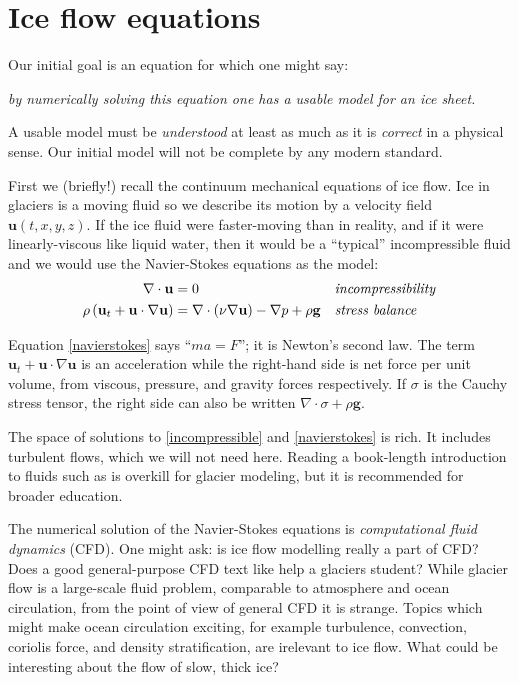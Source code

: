 \documentclass[letterpaper,final,12pt,reqno]{amsart}
\begin{document}
\section{Ice flow equations}  \label{sec:continuum}

Our initial goal is an equation for which one might say:
\begin{center}
\emph{by numerically solving this equation one has a usable model for an ice sheet.}
\end{center}
A usable model must be \emph{understood} at least as much as it is \emph{correct} in a physical sense.  Our initial model will not be complete by any modern standard.

First we (briefly!) recall the continuum mechanical equations of ice flow.  Ice in glaciers is a moving fluid so we describe its motion by a velocity field $\mathbf{u}(t,x,y,z)$.  If the ice fluid were faster-moving than in reality, and if it were linearly-viscous like liquid water, then it would be a ``typical'' incompressible fluid and we would use the Navier-Stokes equations as the model:
\begin{align}
\nabla \cdot \mathbf{u} &= 0 &&\text{\emph{incompressibility}} \label{incompressible} \\
\rho \left(\mathbf{u}_t + \mathbf{u}\cdot\nabla \mathbf{u}\right) &= \nabla \cdot (\nu \nabla \mathbf{u}) - \nabla p + \rho \mathbf{g} &&\text{\emph{stress balance}} \label{navierstokes}
\end{align}

Equation \eqref{navierstokes} says ``$ma=F$''; it is Newton's second law.  The term $\mathbf{u}_t + \mathbf{u}\cdot\nabla \mathbf{u}$ is an acceleration while the right-hand side is net force per unit volume, from viscous, pressure, and gravity forces respectively.  If $\sigma$ is the Cauchy stress tensor, the right side can also be written $\nabla \cdot \sigma + \rho \mathbf{g}$.

The space of solutions to \eqref{incompressible} and \eqref{navierstokes} is rich.  It includes turbulent flows, which we will not need here.  Reading a book-length introduction to fluids such as \cite{Acheson} is overkill for glacier modeling, but it is recommended for broader education.

The numerical solution of the Navier-Stokes equations is \emph{computational fluid dynamics} (CFD).  One might ask: is ice flow modelling really a part of CFD?  Does a good general-purpose CFD text like \cite{Wesseling} help a glaciers student?  While glacier flow is a large-scale fluid problem, comparable to atmosphere and ocean circulation, from the point of view of general CFD it is strange.   Topics which might make ocean circulation exciting, for example turbulence, convection, coriolis force, and density stratification, are irelevant to ice flow.  What could be interesting about the flow of slow, thick ice?
\end{document}
